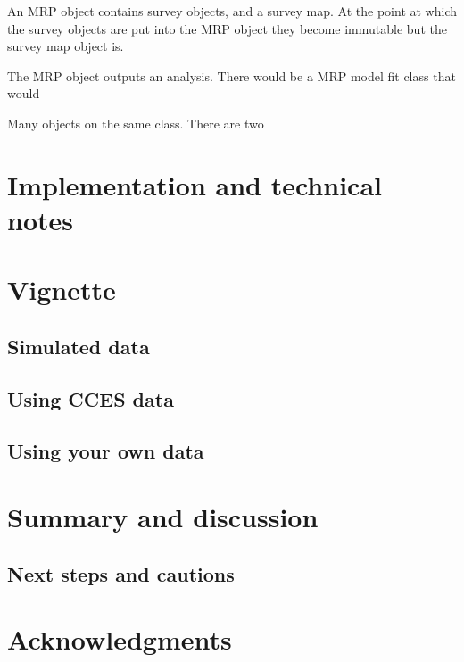 \documentclass[
]{jss}
\begin{document}
An MRP object contains survey objects, and a survey map. At the point at
which the survey objects are put into the MRP object they become
immutable but the survey map object is.

The MRP object outputs an analysis. There would be a MRP model fit class
that would

Many objects on the same class. There are two

\section{Implementation and technical notes} \label{sec:implementation}

\section{Vignette} \label{sec:vignette}

\subsection*{Simulated data}

\subsection*{Using CCES data}

\subsection*{Using your own data}

\section{Summary and discussion} \label{sec:summary}

\subsection*{Next steps and cautions}

\section*{Acknowledgments}


\end{document}
